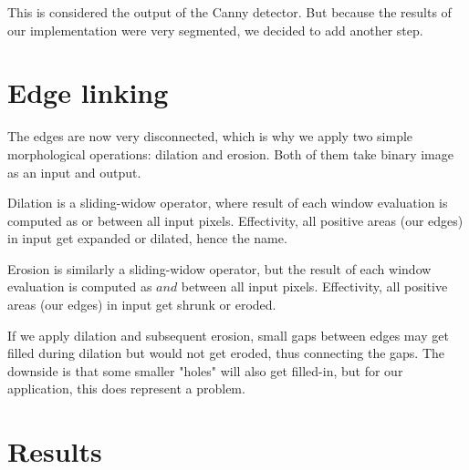 \documentclass[fleqn,moreauthors,10pt]{ds_report}
\begin{document}
This is considered the output of the Canny detector. But because the results of our implementation were very segmented, we decided to add another step.

\section*{Edge linking}

The edges are now very disconnected, which is why we apply two simple morphological operations: dilation and erosion. Both of them take binary image as an input and output.

Dilation is a sliding-widow operator, where result of each window evaluation is computed as or between all input pixels. Effectivity, all positive areas (our edges) in input get expanded or dilated, hence the name. 

Erosion is similarly a sliding-widow operator, but the result of each window evaluation is computed as $and$ between all input pixels. Effectivity, all positive areas (our edges) in input get shrunk or eroded. 

If we apply dilation and subsequent erosion, small gaps between edges may get filled during dilation but would not get eroded, thus connecting the gaps. The downside is that some smaller "holes" will also get filled-in, but for our application, this does represent a problem.

\section*{Results}
\end{document}

